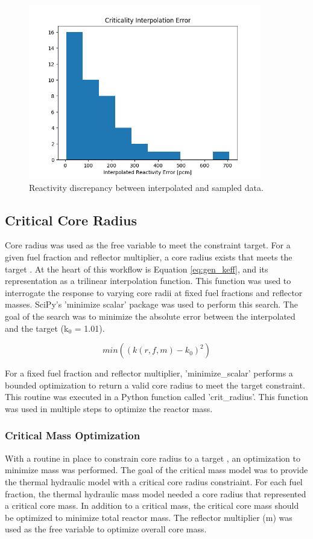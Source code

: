 \begin{figure}[h]
    \centering
    \includegraphics[width=4in]{../images/check_interp.png}
\caption{Reactivity discrepancy between interpolated and sampled data.}
\label{fig:interp_check}
\end{figure}

\subsection{Critical Core Radius}
Core radius was used as the free variable to meet the \keff constraint target. For
a given fuel fraction and reflector multiplier, a core radius exists that meets
the target \keff. At the heart of this workflow is Equation \ref{eq:gen_keff},
and its representation as a trilinear interpolation function. This function was
used to interrogate the \keff response to varying core radii at fixed fuel
fractions and reflector masses. SciPy's 'minimize scalar' package was used to
perform this search. The goal of the search was to minimize the absolute error
between the interpolated \keff and the target \keff (k$_0$ = 1.01).

\begin{equation}
    min( (k(r, f, m) - k_0)^2 )
    \label{eq:crit_rad}
\end{equation}

For a fixed fuel fraction and reflector multiplier, 'minimize\_scalar' performs a
bounded optimization to return a valid core radius to meet the target \keff
constraint. This routine was executed in a Python function called 'crit\_radius'.
This function was used in multiple steps to optimize the reactor mass.

\subsubsection{Critical Mass Optimization}
With a routine in place to constrain core radius to a target \keff, an
optimization to minimize mass was performed. The goal of the critical mass model
was to provide the thermal hydraulic model with a critical core radius
constriaint. For each
fuel fraction, the thermal hydraulic mass model needed a core radius that
represented a critical core mass. In addition to a critical mass, the critical
core mass should be optimized to minimize total reactor mass. 
The reflector multiplier (m) was used as the free variable to optimize overall core mass. 

